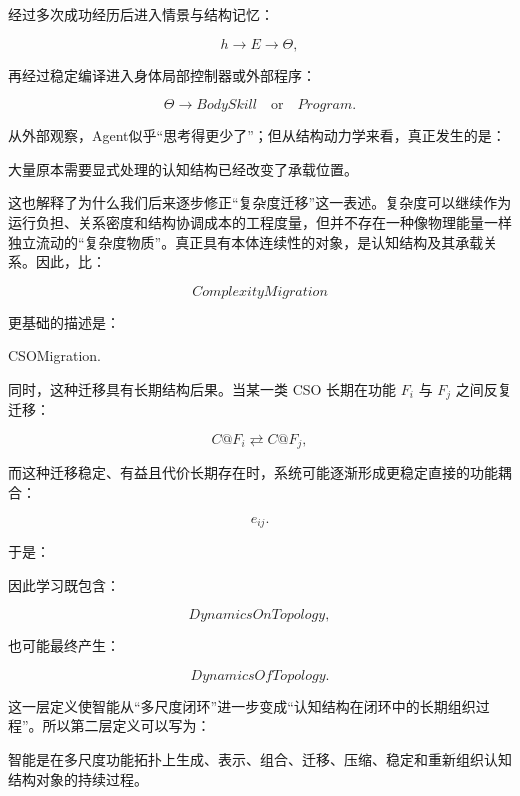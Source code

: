 经过多次成功经历后进入情景与结构记忆：

\[
h
\rightarrow
E
\rightarrow
\Theta,
\]

再经过稳定编译进入身体局部控制器或外部程序：

\[
\Theta
\rightarrow
BodySkill
\quad \text{or}\quad
Program.
\]

从外部观察，Agent似乎“思考得更少了”；但从结构动力学来看，真正发生的是：

\begin{statementbox}
\centering
{}
\end{statementbox}

大量原本需要显式处理的认知结构已经改变了承载位置。

这也解释了为什么我们后来逐步修正“复杂度迁移”这一表述。复杂度可以继续作为运行负担、关系密度和结构协调成本的工程度量，但并不存在一种像物理能量一样独立流动的“复杂度物质”。真正具有本体连续性的对象，是认知结构及其承载关系。因此，比：

\[
ComplexityMigration
\]

更基础的描述是：

\begin{statementbox}
CSOMigration.
\end{statementbox}

同时，这种迁移具有长期结构后果。当某一类 CSO 长期在功能 \(F_i\) 与 \(F_j\) 之间反复迁移：

\[
C@F_i
\rightleftarrows
C@F_j,
\]

而这种迁移稳定、有益且代价长期存在时，系统可能逐渐形成更稳定直接的功能耦合：

\[
e_{ij}.
\]

于是：

\begin{statementbox}
\centering
{}
\end{statementbox}

因此学习既包含：

\[
DynamicsOnTopology,
\]

也可能最终产生：

\[
DynamicsOfTopology.
\]

这一层定义使智能从“多尺度闭环”进一步变成“认知结构在闭环中的长期组织过程”。所以第二层定义可以写为：

\begin{definition*}
智能是在多尺度功能拓扑上生成、表示、组合、迁移、压缩、稳定和重新组织认知结构对象的持续过程。
\end{definition*}

